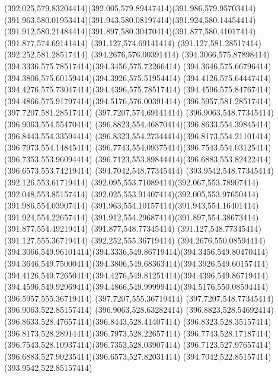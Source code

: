 {{	\curveto(392.025,579.83204414)(392.005,579.89447414)(391.986,579.95703414)
	\curveto(391.963,580.01953414)(391.943,580.08197414)(391.924,580.14454414)
	\curveto(391.912,580.21484414)(391.897,580.30470414)(391.877,580.41017414)
	\lineto(391.877,574.69141414)
	\lineto(391.127,574.69141414)
	\lineto(391.127,581.28517414)
	\lineto(392.252,581.28517414)
	\lineto(394.2676,576.00391414)
	\curveto(394.3066,575.87898414)(394.3336,575.78517414)(394.3456,575.72266414)
	\curveto(394.3646,575.66796414)(394.3806,575.60159414)(394.3926,575.51954414)
	\curveto(394.4126,575.64447414)(394.4276,575.73047414)(394.4396,575.78517414)
	\curveto(394.4596,575.84767414)(394.4866,575.91797414)(394.5176,576.00391414)
	\lineto(396.5957,581.28517414)
	\lineto(397.7207,581.28517414)
	\lineto(397.7207,574.69141414)
	\closepath
	\moveto(396.9063,548.77345414)
	\lineto(396.9063,554.55470414)
	\curveto(396.8823,554.46870414)(396.8633,554.39845414)(396.8443,554.33594414)
	\curveto(396.8323,554.27344414)(396.8173,554.21101414)(396.7973,554.14845414)
	\curveto(396.7743,554.09375414)(396.7543,554.03125414)(396.7353,553.96094414)
	\curveto(396.7123,553.89844414)(396.6883,553.82422414)(396.6573,553.74219414)
	\lineto(394.7042,548.77345414)
	\lineto(393.9542,548.77345414)
	\lineto(392.126,553.61719414)
	\curveto(392.095,553.71089414)(392.067,553.78907414)(392.048,553.85157414)
	\curveto(392.025,553.91407414)(392.005,553.97650414)(391.986,554.03907414)
	\curveto(391.963,554.10157414)(391.943,554.16401414)(391.924,554.22657414)
	\curveto(391.912,554.29687414)(391.897,554.38673414)(391.877,554.49219414)
	\lineto(391.877,548.77345414)
	\lineto(391.127,548.77345414)
	\lineto(391.127,555.36719414)
	\lineto(392.252,555.36719414)
	\lineto(394.2676,550.08594414)
	\curveto(394.3066,549.96101414)(394.3336,549.86719414)(394.3456,549.80470414)
	\curveto(394.3646,549.75000414)(394.3806,549.68363414)(394.3926,549.60157414)
	\curveto(394.4126,549.72650414)(394.4276,549.81251414)(394.4396,549.86719414)
	\curveto(394.4596,549.92969414)(394.4866,549.99999414)(394.5176,550.08594414)
	\lineto(396.5957,555.36719414)
	\lineto(397.7207,555.36719414)
	\lineto(397.7207,548.77345414)
	\closepath
	\moveto(396.9063,522.85157414)
	\lineto(396.9063,528.63282414)
	\curveto(396.8823,528.54692414)(396.8633,528.47657414)(396.8443,528.41407414)
	\curveto(396.8323,528.35157414)(396.8173,528.28914414)(396.7973,528.22657414)
	\curveto(396.7743,528.17187414)(396.7543,528.10937414)(396.7353,528.03907414)
	\curveto(396.7123,527.97657414)(396.6883,527.90235414)(396.6573,527.82031414)
	\lineto(394.7042,522.85157414)
	\lineto(393.9542,522.85157414)
}}
